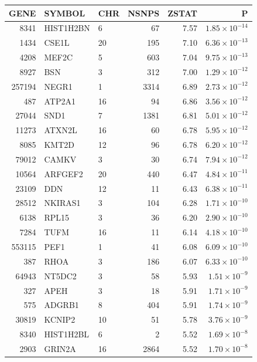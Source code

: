 \begin{table}[ht]
\centering
\begin{tabular}{rllrrr}
  \hline
GENE & SYMBOL & CHR & NSNPS & ZSTAT & P \\ 
  \hline
8341 & HIST1H2BN & 6 &  67 & 7.57 & $1.85 \times 10^{-14}$ \\ 
  1434 & CSE1L & 20 & 195 & 7.10 & $6.36 \times 10^{-13}$ \\ 
  4208 & MEF2C & 5 & 603 & 7.04 & $9.75 \times 10^{-13}$ \\ 
  8927 & BSN & 3 & 312 & 7.00 & $1.29 \times 10^{-12}$ \\ 
  257194 & NEGR1 & 1 & 3314 & 6.89 & $2.73 \times 10^{-12}$ \\ 
  487 & ATP2A1 & 16 &  94 & 6.86 & $3.56 \times 10^{-12}$ \\ 
  27044 & SND1 & 7 & 1381 & 6.81 & $5.01 \times 10^{-12}$ \\ 
  11273 & ATXN2L & 16 &  60 & 6.78 & $5.95 \times 10^{-12}$ \\ 
  8085 & KMT2D & 12 &  96 & 6.78 & $6.20 \times 10^{-12}$ \\ 
  79012 & CAMKV & 3 &  30 & 6.74 & $7.94 \times 10^{-12}$ \\ 
  10564 & ARFGEF2 & 20 & 440 & 6.47 & $4.84 \times 10^{-11}$ \\ 
  23109 & DDN & 12 &  11 & 6.43 & $6.38 \times 10^{-11}$ \\ 
  28512 & NKIRAS1 & 3 & 104 & 6.28 & $1.71 \times 10^{-10}$ \\ 
  6138 & RPL15 & 3 &  36 & 6.20 & $2.90 \times 10^{-10}$ \\ 
  7284 & TUFM & 16 &  11 & 6.14 & $4.18 \times 10^{-10}$ \\ 
  553115 & PEF1 & 1 &  41 & 6.08 & $6.09 \times 10^{-10}$ \\ 
  387 & RHOA & 3 & 186 & 6.07 & $6.33 \times 10^{-10}$ \\ 
  64943 & NT5DC2 & 3 &  58 & 5.93 & $1.51 \times 10^{-9}$ \\ 
  327 & APEH & 3 &  18 & 5.91 & $1.71 \times 10^{-9}$ \\ 
  575 & ADGRB1 & 8 & 404 & 5.91 & $1.74 \times 10^{-9}$ \\ 
  30819 & KCNIP2 & 10 &  51 & 5.78 & $3.76 \times 10^{-9}$ \\ 
  8340 & HIST1H2BL & 6 &   2 & 5.52 & $1.69 \times 10^{-8}$ \\ 
  2903 & GRIN2A & 16 & 2864 & 5.52 & $1.70 \times 10^{-8}$ \\ 

\end{tabular}
\end{table}
